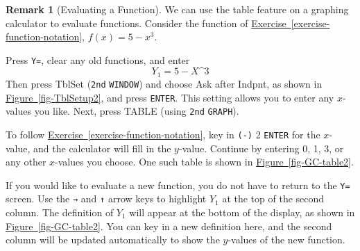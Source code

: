 \documentclass[10pt,]{book}
\theoremstyle{plain}
\theoremstyle{definition}
\newtheorem{remark}[theorem]{Remark}
\theoremstyle{definition}
\theoremstyle{definition}
\newlength{\panelmax}
\begin{document}
\begin{remark}[Evaluating a Function]\label{remark-2}
We can use the table feature on a graphing calculator to evaluate functions. Consider the function of \hyperref[exercise-function-notation]{Exercise~\ref{exercise-function-notation}}, \(f(x) = 5 - x^3\).%
\par
Press \lstinline?Y=?, clear any old functions, and enter%
\begin{equation*}
Y_1 = 5-X \text{^} 3
\end{equation*}
Then press TblSet (\lstinline?2nd? \lstinline?WINDOW?) and choose Ask after Indpnt, as shown in \hyperref[fig-TblSetup2]{Figure~\ref{fig-TblSetup2}}, and press \lstinline?ENTER?. This setting allows you to enter any \(x\)-values you like. Next, press TABLE (using \lstinline?2nd? \lstinline?GRAPH?).%
\par
To follow \hyperref[exercise-function-notation]{Exercise~\ref{exercise-function-notation}}, key in \lstinline?(-)? 2 \lstinline?ENTER? for the \(x\)-value, and the calculator will fill in the \(y\)-value. Continue by entering 0, 1, 3, or any other \(x\)-values you choose. One such table is shown in \hyperref[fig-GC-table2]{Figure~\ref{fig-GC-table2}}.%
\par
If you would like to evaluate a new function, you do not have to return to the \lstinline?Y=? screen. Use the \lstinline?→? and \lstinline?↑? arrow keys to highlight \(Y_1\) at the top of the second column. The definition of \(Y_1\) will appear at the bottom of the display, as shown in \hyperref[fig-GC-table2]{Figure~\ref{fig-GC-table2}}. You can key in a new definition here, and the second column will be updated automatically to show the \(y\)-values of the new function. %
{%
\setlength{\panelmax}{0pt}
\newsavebox{\panelboxFimage}
}
\end{remark}
\end{document}
